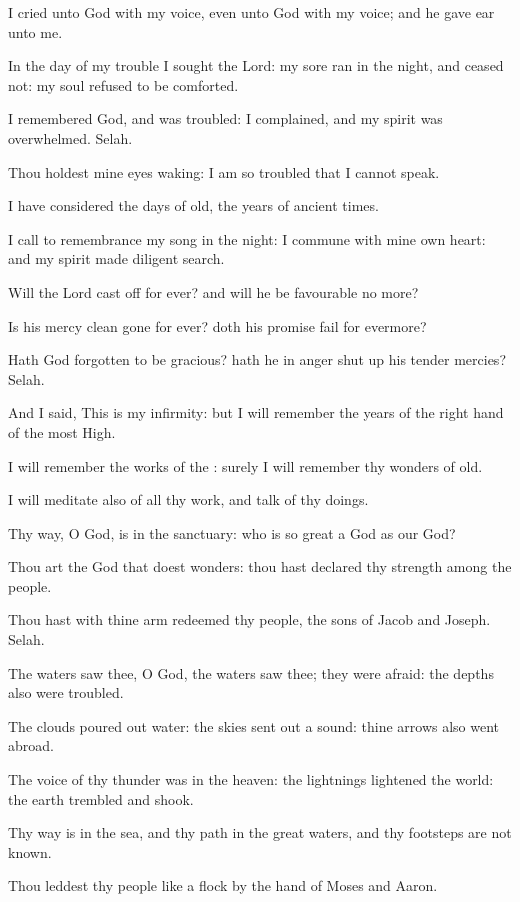 \Chapter
\Verse I cried unto God with my voice, even unto God with my voice; and he gave ear unto me.

\Verse In the day of my trouble I sought the Lord: my sore ran in the night, and ceased not: my soul refused to be comforted.

\Verse I remembered God, and was troubled: I complained, and my spirit was overwhelmed. Selah.

\Verse Thou holdest mine eyes waking: I am so troubled that I cannot speak.

\Verse I have considered the days of old, the years of ancient times.

\Verse I call to remembrance my song in the night: I commune with mine own heart: and my spirit made diligent search.

\Verse Will the Lord cast off for ever? and will he be favourable no more?

\Verse Is his mercy clean gone for ever? doth his promise fail for evermore?

\Verse Hath God forgotten to be gracious? hath he in anger shut up his tender mercies? Selah.

\Verse And I said, This is my infirmity: but I will remember the years of the right hand of the most High.

\Verse I will remember the works of the \LORD: surely I will remember thy wonders of old.

\Verse I will meditate also of all thy work, and talk of thy doings.

\Verse Thy way, O God, is in the sanctuary: who is so great a God as our God?

\Verse Thou art the God that doest wonders: thou hast declared thy strength among the people.

\Verse Thou hast with thine arm redeemed thy people, the sons of Jacob and Joseph. Selah.

\Verse The waters saw thee, O God, the waters saw thee; they were afraid: the depths also were troubled.

\Verse The clouds poured out water: the skies sent out a sound: thine arrows also went abroad.

\Verse The voice of thy thunder was in the heaven: the lightnings lightened the world: the earth trembled and shook.

\Verse Thy way is in the sea, and thy path in the great waters, and thy footsteps are not known.

\Verse Thou leddest thy people like a flock by the hand of Moses and Aaron.




